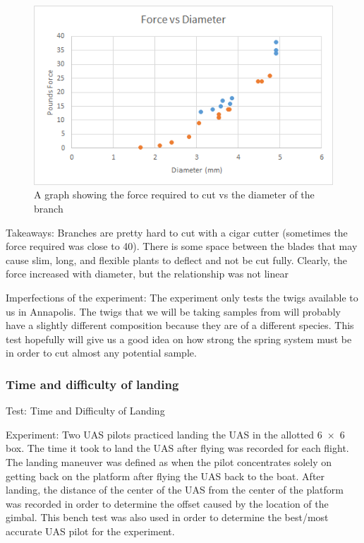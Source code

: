 \documentclass{wrcecapstone}
\begin{document}
\begin{figure}
\begin{center}
\includegraphics[width=\columnwidth]{figures/fig924.png}
\end{center}
\caption{A graph showing the force required to cut vs the diameter of the branch}
\label{fig:9.2.4}
\end{figure}

Takeaways:
Branches are pretty hard to cut with a cigar cutter (sometimes the force required was close to \SI{40}{\poundforce}). There is some space between the blades that may cause slim, long, and flexible plants to deflect and not be cut fully. Clearly, the force increased with diameter, but the relationship was not linear

Imperfections of the experiment: The experiment only tests the twigs available to us in Annapolis.  The twigs that we will be taking samples from will probably have a slightly different composition because they are of a different species.  This test hopefully will give us a good idea on how strong the spring system must be in order to cut almost any potential sample.



\subsubsection{Time and difficulty of landing}
  
Test: Time and Difficulty of Landing

Experiment:
Two UAS pilots practiced landing the UAS in the allotted \SI{6x6}{\foot} box. The time it took to land the UAS after flying was recorded for each flight. The landing maneuver was defined as when the pilot concentrates solely on getting back on the platform after flying the UAS back to the boat.
After landing, the distance of the center of the UAS from the center of the platform was recorded in order to determine the offset caused by the location of the gimbal.  This bench test was also used in order to determine the best/most accurate UAS pilot for the experiment.
\end{document}

